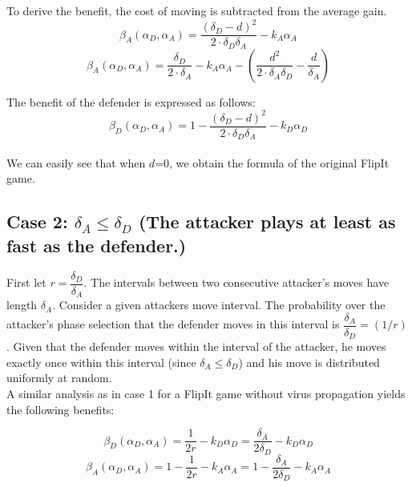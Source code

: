 \documentclass[journal,a4paper]{IEEEtran}
\begin{document}
To derive the benefit, the cost of moving is subtracted from the average gain. 
\begin{equation}\label{first}
\beta_{A}(\alpha_{D},\alpha_{A}) = \dfrac { (\delta_{D}-d) ^{2}} {2 \cdot \delta_{D}  \delta_{A}} - k_{A} \alpha_{A}
\end{equation}
\begin{equation}\label{first}
\beta_{A}(\alpha_{D},\alpha_{A}) = \dfrac { \delta_{D}} {2 \cdot \delta_{A}} - k_{A} \alpha_{A} - ( \dfrac{d^{2}}{2 \cdot \delta_{A} \delta_{D}} - \dfrac{d}{\delta_{A}} )
\end{equation}
 
 
 The benefit of the defender is expressed as follows:
 \begin{equation}\label{first}
\beta_{D}(\alpha_{D},\alpha_{A}) = 1 - \dfrac { (\delta_{D}-d) ^{2}} {2 \cdot \delta_{D}  \delta_{A}} - k_{D} \alpha_{D}
\end{equation}
~~\\
We can easily see that when $d$=0, we obtain the formula of the original FlipIt game.\\


\subsection*{\textbf{Case 2:} $\delta_{A} \leq \delta_{D} $ (The attacker plays at least as fast as the defender.) }

First let $r = \dfrac{\delta_{D}}{ \delta_{A} }$. The intervals between two consecutive attacker's moves have length $\delta_{A}$. Consider a given attackers move interval. The probability over the attacker's phase selection that the defender moves in this interval is $\dfrac{\delta_{A}}{ \delta_{D} } = (1/r)$. Given that the defender moves within the interval of the attacker, he moves exactly once within this interval (since $\delta_{A} \leq \delta_{D} $) and his move is distributed uniformly at random. \\

A similar analysis as in case 1 for a FlipIt game without virus propagation yields the following benefits:

\begin{equation}\label{first}
\beta_{D}(\alpha_{D},\alpha_{A}) = \dfrac {1} {2r} - k_{D} \alpha_{D} = \dfrac {\delta_{A}} {2\delta_{D}} - k_{D} \alpha_{D} 
\end{equation}
\begin{equation}\label{first}
\beta_{A}(\alpha_{D},\alpha_{A}) =1 - \dfrac {1} {2r} - k_{A} \alpha_{A} = 1- \dfrac {\delta_{A}} {2\delta_{D}} - k_{A} \alpha_{A}  
\end{equation}\\
\end{document}
